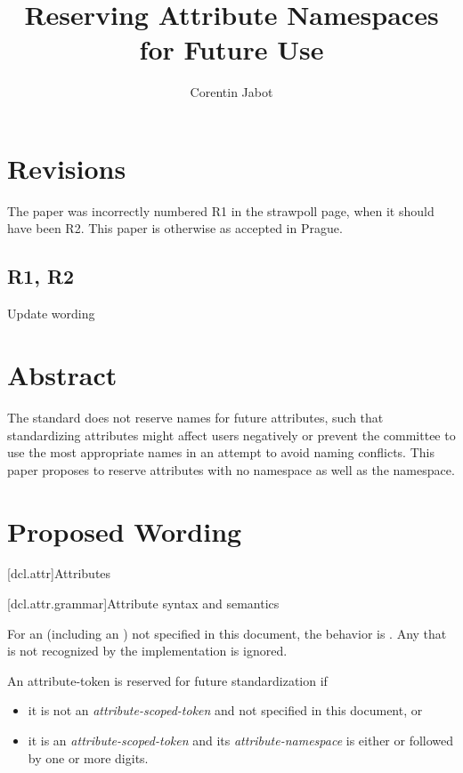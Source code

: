 \documentclass{wg21}
\title{Reserving Attribute Namespaces for Future Use}
\author{Corentin Jabot}{corentin.jabot@gmail.com}
\begin{document}
\maketitle

\section{Revisions}

\begin{note}
The paper was incorrectly numbered R1 in the strawpoll page, when it should have been R2.
This paper is otherwise as accepted in Prague. 
\end{note}

\subsection{R1, R2}

Update wording

\section{Abstract}

The standard does not reserve names for future attributes, such that standardizing attributes might affect users negatively
or prevent the committee to use the most appropriate names in an attempt to avoid naming conflicts.
This paper proposes to reserve attributes with no namespace as well as the  namespace.

\section{Proposed Wording}

[dcl.attr]{Attributes}%

[dcl.attr.grammar]{Attribute syntax and semantics}

\pnum
For an 
(including an )
not specified in this document, the
behavior is .
Any  that is not recognized by the implementation
is ignored.

\begin{addedblock}
An attribute-token is reserved for future standardization if
\begin{itemize}
\item it is not an \emph{attribute-scoped-token} and not specified in this document, or
\item it is an \emph{attribute-scoped-token} and its \emph{attribute-namespace} is either  or  followed by one or more digits.
\end{itemize}
\end{addedblock}
\end{document}
